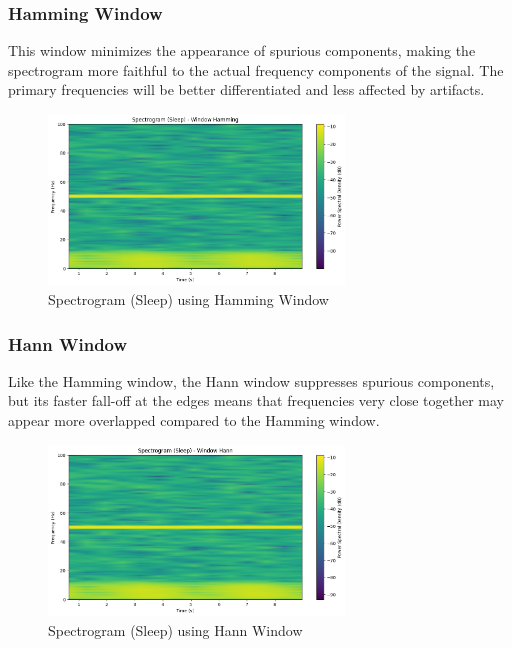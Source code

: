 \documentclass[10pt]{article}
\theoremstyle{definition}
\theoremstyle{remark}
\theoremstyle{definition}
\numberwithin{equation}{prob}
\begin{document}
\subsubsection{Hamming Window}
This window minimizes the appearance of spurious components, making the spectrogram more faithful to the actual frequency components of the signal. The primary frequencies will be better differentiated and less affected by artifacts.

\begin{figure}[H]
    \centering
    \includegraphics[width=0.7\textwidth]{./figures/Spectrogram Sleep Window Hamming.png}
    \caption{Spectrogram (Sleep) using Hamming Window}
\end{figure}

\subsubsection{Hann Window}
Like the Hamming window, the Hann window suppresses spurious components, but its faster fall-off at the edges means that frequencies very close together may appear more overlapped compared to the Hamming window.

\begin{figure}[H]
    \centering
    \includegraphics[width=0.7\textwidth]{./figures/Spectrogram Sleep Window Hann.png}
    \caption{Spectrogram (Sleep) using Hann Window}
\end{figure}
\end{document}

